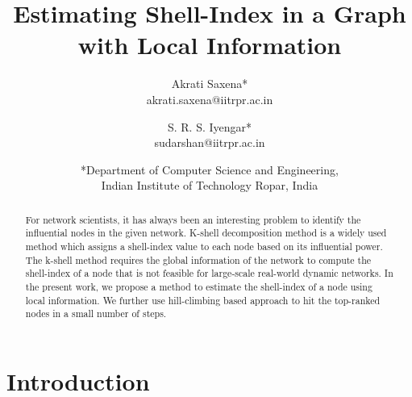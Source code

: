 \documentclass[12pt,3p]{article}
\begin{document}

\title{Estimating Shell-Index in a Graph with Local Information}


\author{%
  Akrati Saxena*\\akrati.saxena@iitrpr.ac.in
  \and S. R. S. Iyengar*\\sudarshan@iitrpr.ac.in
  \and *Department of Computer Science and Engineering,\\ Indian Institute of Technology Ropar, India
  }
\date{}

\maketitle

\begin{abstract}
For network scientists, it has always been an interesting problem to identify the influential nodes in the given network. K-shell decomposition method is a widely used method which assigns a shell-index value to each node based on its influential power. The k-shell method requires the global information of the network to compute the shell-index of a node that is not feasible for large-scale real-world dynamic networks. In the present work, we propose a method to estimate the shell-index of a node using local information. We further use hill-climbing based approach to hit the top-ranked nodes in a small number of steps.


\end{abstract}



\section{Introduction}
\end{document}
